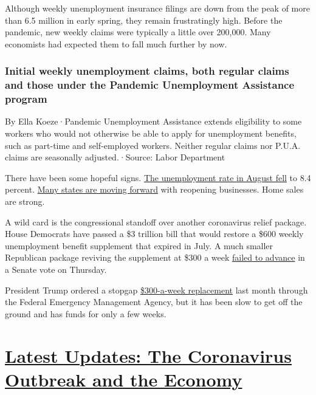 Although weekly unemployment insurance filings are down from the peak of
more than 6.5 million in early spring, they remain frustratingly high.
Before the pandemic, new weekly claims were typically a little over
200,000. Many economists had expected them to fall much further by now.

\hypertarget{initial-weekly-unemployment-claims-both-regular-claims-and-those-under-the-pandemic-unemployment-assistance-program}{%
\subsubsection{Initial weekly unemployment claims, both regular claims
and those under the Pandemic Unemployment Assistance
program}\label{initial-weekly-unemployment-claims-both-regular-claims-and-those-under-the-pandemic-unemployment-assistance-program}}

By Ella Koeze·Pandemic Unemployment Assistance extends eligibility to
some workers who would not otherwise be able to apply for unemployment
benefits, such as part-time and self-employed workers. Neither regular
claims nor P.U.A. claims are seasonally adjusted.·Source: Labor
Department

There have been some hopeful signs.
\href{https://www.nytimes3xbfgragh.onion/2020/09/04/business/economy/jobs-report.html}{The
unemployment rate in August fell} to 8.4 percent.
\href{https://www.nytimes3xbfgragh.onion/2020/09/09/nyregion/indoor-dining-coronavirus.html}{Many
states are moving forward} with reopening businesses. Home sales are
strong.

A wild card is the congressional standoff over another coronavirus
relief package. House Democrats have passed a \$3 trillion bill that
would restore a \$600 weekly unemployment benefit supplement that
expired in July. A much smaller Republican package reviving the
supplement at \$300 a week
\href{https://www.nytimes3xbfgragh.onion/2020/09/10/world/covid-19-coronavirus.html\#link-3c53e6c9}{failed
to advance} in a Senate vote on Thursday.

President Trump ordered a stopgap
\href{https://www.nytimes3xbfgragh.onion/article/stimulus-unemployment-payment-benefit.html}{\$300-a-week
replacement} last month through the Federal Emergency Management Agency,
but it has been slow to get off the ground and has funds for only a few
weeks.

\hypertarget{latest-updates-the-coronavirus-outbreak-and-the-economy}{%
\section{\texorpdfstring{\href{https://www.nytimes3xbfgragh.onion/live/2020/09/11/business/stock-market-today-coronavirus?action=click\&pgtype=Article\&state=default\&region=MAIN_CONTENT_1\&context=storylines_live_updates}{Latest
Updates: The Coronavirus Outbreak and the
Economy}}{Latest Updates: The Coronavirus Outbreak and the Economy}}\label{latest-updates-the-coronavirus-outbreak-and-the-economy}}

